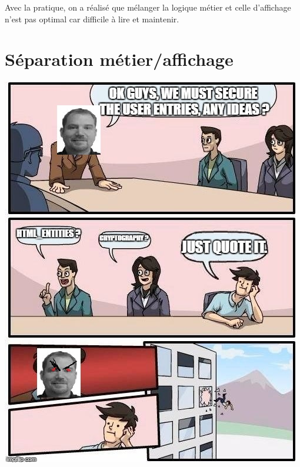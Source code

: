 Avec la pratique, on a réalisé que mélanger la logique métier et celle
d'affichage n'est pas optimal car difficile à lire et maintenir.

\hypertarget{suxe9paration-muxe9tieraffichage}{%
\section{Séparation
métier/affichage}\label{suxe9paration-muxe9tieraffichage}}

\begin{english}

\begin{Shaded}
\begin{Highlighting}[]
 


 \OtherTok{;}

 \OtherTok{(}\NormalTok{ === }\OtherTok{[}\OtherTok{])}\NormalTok{ \{}
     \OtherTok{;}
\NormalTok{\} }\NormalTok{ \{}
     \OtherTok{;}
\NormalTok{\}}
\end{Highlighting}
\end{Shaded}

\end{english}

\includegraphics{src/img/meme10.jpg}

